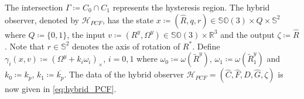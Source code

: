 \documentclass{article}
\newcommand{\SOthree}{\mathbb{SO}(3)}
\newcommand{\sothree}{\mathfrak{so}(3)}
\newcommand{\R}[1]{\mathbb{R}^{#1}}
\newcommand{\Omegay}{\Omega^y}
\newcommand{\Rtilde}{\tilde{R}}
\newcommand{\normSOthree}[1]{{{\vert}#1 {\vert}_I}}
\newcommand{\Rstar}{{R^*}}
\begin{document}


The intersection $\Gamma \coloneqq C_0\cap C_1$ represents the hysteresis region. The hybrid observer, denoted by $\mathcal{H}_{PCF}$, has the state $x \coloneqq (\hat{R}, q, r) \in \SOthree \times Q \times \mathbb{S}^2$ where $Q\coloneqq \{0,1\}$, the input $v \coloneqq (R^y, \Omega^y)\in \SOthree\times \R{3}$ and the output $\zeta \coloneqq \hat{R}$. Note that $r\in\mathbb{S}^2$ denotes the axis of rotation of $\Rstar$. Define $\gamma_i(x, v) \coloneqq (\Omegay + k_i\omega_i)_\times$, $i=0,1$ where $\omega_0 \coloneqq \omega(\Rtilde^y)$, $\omega_1 \coloneqq \omega(\Rtilde_1^y)$ and $k_0 \coloneqq k_p$, $k_1\coloneqq \overline{k_p}$. The data of the hybrid observer $\mathcal{H}_{PCF} = (\hat{C}, \hat{F}, \hat{D}, \hat{G}, \zeta)$ is now given in \eqref{eq:hybrid_PCF}. 
\end{document}

